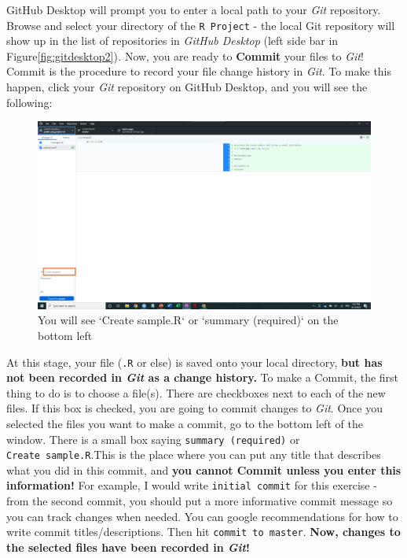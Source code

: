 \documentclass[
]{book}
\begin{document}
GitHub Desktop will prompt you to enter a local path to your \emph{Git} repository. Browse and select your directory of the \texttt{R\ Project} - the local Git repository will show up in the list of repositories in \emph{GitHub Desktop} (left side bar in Figure\ref{fig:gitdesktop2})\emph{.} Now, you are ready to \textbf{Commit} your files to \emph{Git}! Commit is the procedure to record your file change history in \emph{Git}. To make this happen, click your \emph{Git} repository on GitHub Desktop, and you will see the following:

\begin{figure}

{\centering \includegraphics[width=61.11in]{image/git_image04} 

}

\caption{You will see `Create sample.R` or `summary (required)` on the bottom left}\label{fig:gitdesktop3}
\end{figure}

At this stage, your file (\texttt{.R} or else) is saved onto your local directory, \textbf{but has not been recorded in \emph{Git} as a change history.} To make a Commit, the first thing to do is to choose a file(s). There are checkboxes next to each of the new files. If this box is checked, you are going to commit changes to \emph{Git}. Once you selected the files you want to make a commit, go to the bottom left of the window. There is a small box saying \texttt{summary\ (required)} or \texttt{Create\ sample.R}.This is the place where you can put any title that describes what you did in this commit, and \textbf{you cannot Commit unless you enter this information!} For example, I would write \texttt{initial\ commit} for this exercise - from the second commit, you should put a more informative commit message so you can track changes when needed. You can google recommendations for how to write commit titles/descriptions. Then hit \texttt{commit\ to\ master}. \textbf{Now, changes to the selected files have been recorded in \emph{Git}!}
\end{document}
